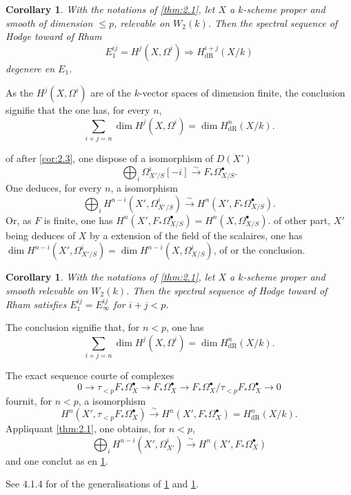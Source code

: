 \documentclass[12pt,a4paper]{article}
\theoremstyle{plain}
\newtheorem{corollary}[theorem]{Corollary}
\theoremstyle{definition}
\theoremstyle{remark}
\newcommand{\dR}{\text{dR}}
\begin{document}
\begin{corollary}\label{cor:2.4}
With the notations of \ref{thm:2.1}, let $X$ a $k$-scheme proper and smooth of dimension $\le p$, relevable on $W_2(k)$. Then the spectral sequence of Hodge toward of Rham
\begin{equation}\label{eq:2.4.1}
E_1^{ij} = H^j(X, \Omega^i) \Rightarrow H^{i+j}_{\dR}(X/k)
\end{equation}
degenere en $E_1$.
\end{corollary}

As the $H^j(X, \Omega^i)$ are of the $k$-vector spaces of dimension finite, the conclusion signifie that the one has, for every $n$,
\[
\sum_{i+j=n} \dim H^j(X, \Omega^i) = \dim H^n_{\dR}(X/k).
\]

of after \ref{cor:2.3}, one dispose of a isomorphism of $D(X')$
\[
\bigoplus_i \Omega^i_{X'/S}[-i] \xrightarrow{\sim} F_* \Omega^{\bullet}_{X/S}.
\]
One deduces, for every $n$, a isomorphism
\[
\bigoplus_i H^{n-i}(X', \Omega^i_{X'/S}) \xrightarrow{\sim} H^n(X', F_* \Omega^{\bullet}_{X/S}).
\]
Or, as $F$ is finite, one has $H^n(X', F_* \Omega^{\bullet}_{X/S}) = H^n(X, \Omega^{\bullet}_{X/S})$. of other part, $X'$ being deduces of $X$ by a extension of the field of the scalaires, one has $\dim H^{n-i}(X', \Omega^i_{X'/S}) = \dim H^{n-i}(X, \Omega^i_{X/S})$, of or the conclusion.

\begin{corollary}\label{cor:2.5}
With the notations of \ref{thm:2.1}, let $X$ a $k$-scheme proper and smooth relevable on $W_2(k)$. Then the spectral sequence of Hodge toward of Rham satisfies $E_1^{ij} = E_\infty^{ij}$ for $i + j < p$.
\end{corollary}

The conclusion signifie that, for $n < p$, one has
\[
\sum_{i+j=n} \dim H^j(X, \Omega^i) = \dim H^n_{\dR}(X/k).
\]

The exact sequence courte of complexes
\[
0 \to \tau_{<p} F_* \Omega^{\bullet}_X \to F_* \Omega^{\bullet}_X \to F_* \Omega^{\bullet}_X / \tau_{<p} F_* \Omega^{\bullet}_X \to 0
\]
fournit, for $n < p$, a isomorphism
\[
H^n(X', \tau_{<p} F_* \Omega^{\bullet}_X) \xrightarrow{\sim} H^n(X', F_* \Omega^{\bullet}_X) = H^n_{\dR}(X/k).
\]
Appliquant \ref{thm:2.1}, one obtains, for $n < p$,
\[
\bigoplus_i H^{n-i}(X', \Omega^i_{X'}) \xrightarrow{\sim} H^n(X', F_* \Omega^{\bullet}_X)
\]
and one conclut as en \ref{cor:2.4}.

See 4.1.4 for of the generalisations of \ref{cor:2.4} and \ref{cor:2.5}.
\end{document}
